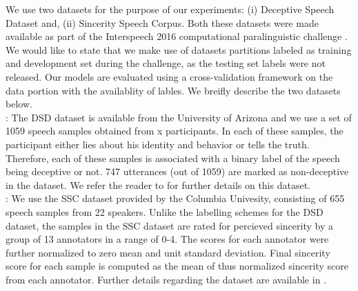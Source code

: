 \documentclass{article}
\begin{document}
We use two datasets for the purpose of our experiments: (i) Deceptive Speech Dataset and, (ii) Sincerity Speech Corpus.
Both these datasets were made available as part of the Interspeech 2016 computational paralinguistic challenge \cite{schuller2016interspeech}.
We would like to state that we make use of datasets partitions labeled as training and development set during the challenge, as the testing set labels were not released.
Our models are evaluated using a cross-validation framework on the data portion with the availablity of lables. 
We breifly describe the two datasets below.\\ 

:
The DSD dataset is available from the University of Arizona and we use a set of 1059 speech samples obtained from x participants.
In each of these samples, the participant either lies about his identity and behavior or tells the truth. 
Therefore, each of these samples is associated with a binary label of the speech being deceptive or not.
747 utterances (out of 1059) are marked as non-deceptive in the dataset.
We refer the reader to \cite{schuller2016interspeech} for further details on this dataset.\\ 

:
We use the SSC dataset provided by the Columbia Univesity, consisting of 655 speech samples from 22 speakers.
Unlike the labelling schemes for the DSD dataset, the samples in the SSC dataset are rated for percieved sincerity by a group of 13 annotators in a range of 0-4. 
The scores for each annotator were further normalized to zero mean and unit standard deviation.
Final sincerity score for each sample is computed as the mean of thus normalized sincerity score from each annotator.
Further details regarding the dataset are available in \cite{schuller2016interspeech}.
\end{document}
